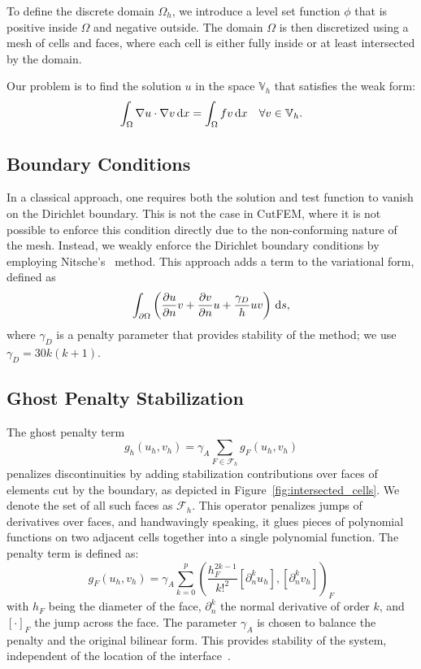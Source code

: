 \documentclass[11pt,a4paper]{article}
\begin{document}
To define the discrete domain $\Omega_h$, we introduce a level set function $\phi$ that is positive inside $\Omega$ and
negative outside. The domain $\Omega$ is then discretized using a mesh of cells and faces, where each cell is either
fully inside or at least intersected by the domain.

Our problem is to find the solution $u$ in the space $\mathbb{V}_h$ that satisfies the weak form:
\begin{equation}
    \int_{\Omega} \nabla u \cdot \nabla v \,\mathrm{d}x = \int_{\Omega} f v \,\mathrm{d}x \quad \forall v \in \mathbb{V}_h.
\end{equation}
\subsection{Boundary Conditions}
In a classical approach, one requires both the solution and test function to vanish on the Dirichlet boundary. This is
not the case in CutFEM, where it is not possible to enforce this condition directly due to the non-conforming nature of
the mesh. Instead, we weakly enforce the Dirichlet boundary conditions by employing
Nitsche's~\cite{nitsche1971variationsprinzip, warburton2003constants} method. This approach adds a term to the
variational form, defined as
\begin{equation}
    \int_{\partial\Omega} \left( \frac{\partial u}{\partial n} v + \frac{\partial v}{\partial n} u +
    \frac{\gamma_D}{h} u v
    \right) \,\mathrm{d}s,
\end{equation}
where \( \gamma_D \) is a penalty parameter that provides stability of the method; we use \( \gamma_D = 30 k (k+1) \).

\subsection{Ghost Penalty Stabilization}
The ghost penalty term
\begin{equation}
    g_h(u_h,v_h) = \gamma_A \sum_{F \in \mathcal{F}_h} g_F(u_h, v_h)
\end{equation}
penalizes discontinuities by adding stabilization contributions over faces of elements cut by the
boundary, as depicted in Figure~\ref{fig:intersected_cells}. We denote the set of all such faces as $\mathcal{F}_h$.
This operator penalizes jumps of derivatives over faces, and handwavingly speaking, it glues pieces of polynomial
functions
on two adjacent cells together into a single polynomial function. The penalty term is defined as:
\begin{equation}
    g_F(u_h, v_h) = \gamma_A \sum_{k=0}^p \left(\frac{h_F^{2k-1}}{k!^2}[\partial_n^k u_h], [\partial_n^k v_h]
    \right)_F
\end{equation}
with $h_F$ being the diameter of the face, $\partial_n^k$ the normal derivative of order $k$, and
$[\cdot]_F$ the jump
across the face. The parameter $\gamma_A$ is chosen to balance the penalty and the original bilinear form. This
provides stability of the system, independent of the location of the
interface~\cite{burman2014fictitious}.
\end{document}
